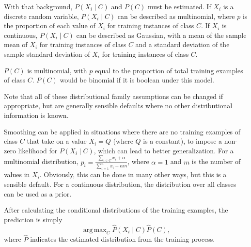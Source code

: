 \documentclass{amsart}
\DeclareMathOperator*{\argmax}{arg\,max}
\begin{document}
    With that background, $P(X_i \mid C)$ and $P(C)$ must be estimated.
    If $X_i$ is a discrete random variable, $P(X_i \mid C)$ can be described as multinomial,
    where $p$ is the proportion of each value of $X_i$ for training instances of class $C$.
    If $X_i$ is continuous, $P(X_i \mid C)$ can be described as Gaussian, with a mean of the sample
    mean of $X_i$ for training instances of class $C$ and a standard deviation of the sample
    standard deviation of $X_i$ for training instances of class $C$.

    $P(C)$ is multinomial, with $p$ equal to the proportion of total training
    examples of class $C$. $P(C)$ would be binomial if it is boolean under this model.

    Note that all of these distributional family assumptions can be changed if appropriate, but
    are generally sensible defaults where no other distributional information is known.

    Smoothing can be applied in situations where there are no training examples of class $C$ that take
    on a value $X_i = Q$ (where $Q$ is a constant), to impose a non-zero likelihood for $P(X_i \mid C)$,
    which can lead to better generalization.
    For a multinomial distribution, $p_i = \frac{\sum_{i \in C} x_i + \alpha}{\sum_{i=1}^n x_i + \alpha m}$,
    where $\alpha=1$ and $m$ is the number of values in $X_i$. Obviously, this can be done in many other ways,
    but this is a sensible default. For a continuous distribution, the distribution over all classes can
    be used as a prior.

    After calculating the conditional distributions of the training examples, the prediction is
    simply
    \[
        \argmax_C \hat{P}(X_i \mid C) \hat{P}(C),
    \]
    where $\hat{P}$ indicates the estimated distribution from the training process.
\end{document}

